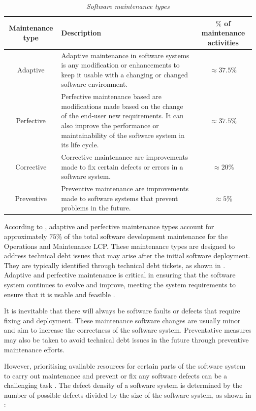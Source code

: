 \begin{table}[!htb]
	\centering
	\caption[Software maintenance types]
	{\textit{Software maintenance types \cite{Ping2010,Hasan2012}}}
	\label{tbl:ch1_maintenanceTypes}
	\begin{tabularx}{\textwidth}{|c|X|c|}
		\hline
		\textbf{Maintenance type} & \textbf{Description} & \textbf{$\%$ of maintenance activities} \\ \hline
		Adaptive & \raggedright Adaptive maintenance in software systems is any modification or enhancements to keep it usable with a changing or changed software environment. & $\approx 37.5\%$ \\ \hline
		Perfective & \raggedright Perfective maintenance based are modifications made based on the change of the end-user new requirements. It can also improve the performance or maintainability of the software system in its life cycle. & $\approx 37.5\%$ \\ \hline
		Corrective & \raggedright Corrective maintenance are improvements made to fix certain defects or errors in a software system. & $\approx 20\%$ \\ \hline
		Preventive & \raggedright  Preventive maintenance are improvements made to software systems that prevent problems in the future. & $\approx 5\%$ \\ \hline
	\end{tabularx}
\end{table}

According to , adaptive and perfective maintenance types account for approximately $75\%$ of the total software development maintenance for the Operations and Maintenance LCP. These maintenance types are designed to address technical debt issues that may arise after the initial software deployment. They are typically identified through technical debt tickets, as shown in . Adaptive and perfective maintenance is critical in ensuring that the software system continues to evolve and improve, meeting the system requirements to ensure that it is usable and feasible \cite{Kumar2013}.\par It is inevitable that there will always be software faults or defects that require fixing and deployment. These maintenance software changes are usually minor and aim to increase the correctness of the software system. Preventative measures may also be taken to avoid technical debt issues in the future through preventive maintenance efforts.\par However, prioritising available resources for certain parts of the software system to carry out maintenance and prevent or fix any software defects can be a challenging task \cite{Mamone1994, Hasan2012}. The defect density of a software system is determined by the number of possible defects divided by the size of the software system, as shown in :

